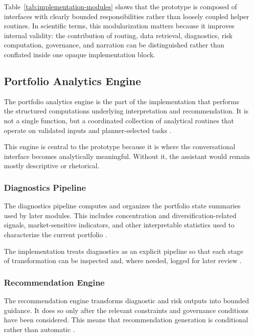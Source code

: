 \documentclass[11pt]{article}
\begin{document}
Table~\ref{tab:implementation-modules} shows that the prototype is composed of interfaces with clearly bounded responsibilities rather than loosely coupled helper routines. In scientific terms, this modularization matters because it improves internal validity: the contribution of routing, data retrieval, diagnostics, risk computation, governance, and narration can be distinguished rather than conflated inside one opaque implementation block.

\subsection{Portfolio Analytics Engine}
The portfolio analytics engine is the part of the implementation that performs the structured computations underlying interpretation and recommendation. It is not a single function, but a coordinated collection of analytical routines that operate on validated inputs and planner-selected tasks \cite{markowitz1952,rockafellar2000,ledoit2004b}.

This engine is central to the prototype because it is where the conversational interface becomes analytically meaningful. Without it, the assistant would remain mostly descriptive or rhetorical.

\subsubsection{Diagnostics Pipeline}
The diagnostics pipeline computes and organizes the portfolio state summaries used by later modules. This includes concentration and diversification-related signals, market-sensitive indicators, and other interpretable statistics used to characterize the current portfolio \cite{demiguel2009,peralta2016,onnela2003}.

The implementation treats diagnostics as an explicit pipeline so that each stage of transformation can be inspected and, where needed, logged for later review \cite{adadi2018,white2000}.

\subsubsection{Recommendation Engine}
The recommendation engine transforms diagnostic and risk outputs into bounded guidance. It does so only after the relevant constraints and governance conditions have been considered. This means that recommendation generation is conditional rather than automatic \cite{rockafellar2002,jagannathan2003,mifid2014}.
\end{document}
